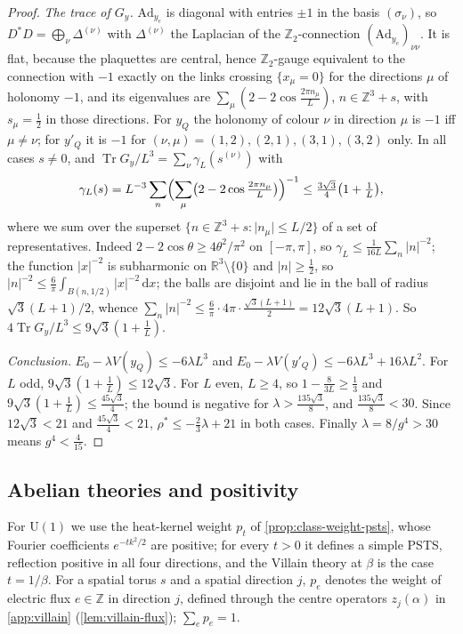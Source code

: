 \documentclass[11pt,a4paper]{amsart}
\theoremstyle{definition}
\theoremstyle{remark}
\numberwithin{equation}{section}
\DeclareMathOperator{\Tr}{Tr}        %
\newcommand{\R}{\mathbb{R}}          %
\newcommand{\Z}{\mathbb{Z}}          %
\newcommand{\abs}[1]{\lvert #1\rvert}      %
\newcommand{\dd}{\,\mathrm{d}}             %
\newcommand{\U}{\mathrm{U}}                %
\newcommand{\PSTS}{\textup{PSTS}}          %
\begin{document}
\begin{proof}
\emph{The trace of $G_y$.} $\mathrm{Ad}_{y_e}$ is diagonal with entries $\pm1$ in the basis $(\sigma_\nu)$, so $D^*D=\bigoplus_\nu\Delta^{(\nu)}$ with $\Delta^{(\nu)}$ the Laplacian of the $\Z_2$-connection $(\mathrm{Ad}_{y_e})_{\nu\nu}$. It is flat, because the plaquettes are central, hence $\Z_2$-gauge equivalent to the connection with $-1$ exactly on the links crossing $\{x_\mu=0\}$ for the directions $\mu$ of holonomy $-1$, and its eigenvalues are $\sum_\mu(2-2\cos\frac{2\pi n_\mu}L)$, $n\in\Z^3+s$, with $s_\mu=\frac12$ in those directions. For $y_Q$ the holonomy of colour $\nu$ in direction $\mu$ is $-1$ iff $\mu\ne\nu$; for $y'_Q$ it is $-1$ for $(\nu,\mu)=(1,2),(2,1),(3,1),(3,2)$ only. In all cases $s\ne0$, and $\Tr G_y/L^3=\sum_\nu\gamma_L(s^{(\nu)})$ with
\[
\gamma_L(s)=L^{-3}\sum_{n}\Bigl(\sum_\mu\bigl(2-2\cos\tfrac{2\pi n_\mu}L\bigr)\Bigr)^{-1}\le\tfrac{3\sqrt3}4\bigl(1+\tfrac1L\bigr),
\]
where we sum over the superset $\{n\in\Z^3+s:\abs{n_\mu}\le L/2\}$ of a set of representatives. Indeed $2-2\cos\theta\ge4\theta^2/\pi^2$ on $[-\pi,\pi]$, so $\gamma_L\le\frac1{16L}\sum_n\abs n^{-2}$; the function $\abs x^{-2}$ is subharmonic on $\R^3\setminus\{0\}$ and $\abs n\ge\frac12$, so $\abs n^{-2}\le\frac6\pi\int_{B(n,1/2)}\abs x^{-2}\dd x$; the balls are disjoint and lie in the ball of radius $\sqrt3(L+1)/2$, whence $\sum_n\abs n^{-2}\le\frac6\pi\cdot4\pi\cdot\frac{\sqrt3(L+1)}2=12\sqrt3(L+1)$. So $4\Tr G_y/L^3\le9\sqrt3(1+\frac1L)$.

\emph{Conclusion.} $E_0-\lambda V(y_Q)\le-6\lambda L^3$ and $E_0-\lambda V(y'_Q)\le-6\lambda L^3+16\lambda L^2$. For $L$ odd, $9\sqrt3(1+\frac1L)\le12\sqrt3$. For $L$ even, $L\ge4$, so $1-\frac8{3L}\ge\frac13$ and $9\sqrt3(1+\frac1L)\le\frac{45\sqrt3}4$; the bound is negative for $\lambda>\frac{135\sqrt3}8$, and $\frac{135\sqrt3}8<30$. Since $12\sqrt3<21$ and $\frac{45\sqrt3}4<21$, $\rho^*\le-\frac23\lambda+21$ in both cases. Finally $\lambda=8/g^4>30$ means $g^4<\frac4{15}$.
\end{proof}

\subsection{Abelian theories and positivity}

For $\U(1)$ we use the heat-kernel weight $p_t$ of \cref{prop:class-weight-psts}, whose Fourier coefficients $e^{-tk^2/2}$ are positive; for every $t>0$ it defines a simple \PSTS{}, reflection positive in all four directions, and the Villain theory at $\beta$ is the case $t=1/\beta$. For a spatial torus $s$ and a spatial direction $j$, $p_e$ denotes the weight of electric flux $e\in\Z$ in direction $j$, defined through the centre operators $z_j(\alpha)$ in \cref{app:villain} (\cref{lem:villain-flux}); $\sum_ep_e=1$.
\end{document}
